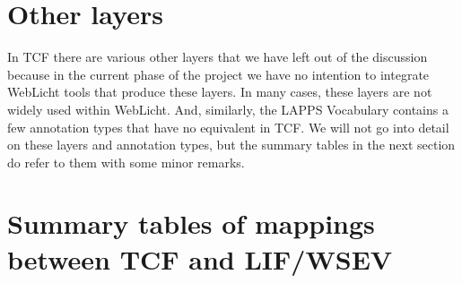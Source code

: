 \documentclass[11pt]{article}
\begin{document}
\section{Other layers}

In TCF there are various other layers that we have left out of the discussion because in the current phase of the project we have no intention to integrate WebLicht tools that produce these layers. In many cases, these layers are not widely used within WebLicht. And, similarly, the LAPPS Vocabulary contains a few annotation types that have no equivalent in TCF. We will not go into detail on these layers and annotation types, but the summary tables in the next section do refer to them with some minor remarks.






\section{Summary tables of mappings between TCF and LIF/WSEV}




\medskip



%
%
%
%
%
\end{document}
